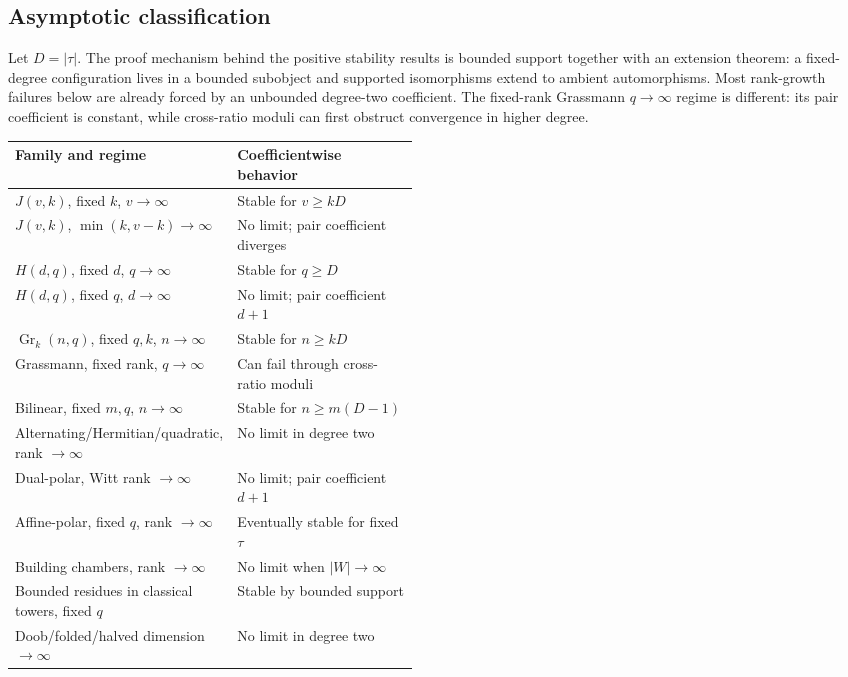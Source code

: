 \documentclass[10pt]{article}
\newcommand{\Gr}{\operatorname{Gr}}
\begin{document}
\subsection{Asymptotic classification}

Let $D=|\tau|$. The proof mechanism behind the positive stability results is
bounded support together with an extension theorem: a fixed-degree
configuration lives in a bounded subobject and supported isomorphisms extend
to ambient automorphisms. Most rank-growth failures below are already forced
by an unbounded degree-two coefficient. The fixed-rank Grassmann
$q\to\infty$ regime is different: its pair coefficient is constant, while
cross-ratio moduli can first obstruct convergence in higher degree.

\begin{center}
\small
\renewcommand{\arraystretch}{1.12}
\begin{tabularx}{\linewidth}{@{}>{\raggedright\arraybackslash}p{0.47\linewidth}X@{}}
\toprule
Family and regime & Coefficientwise behavior \\
\midrule
$J(v,k)$, fixed $k$, $v\to\infty$ & Stable for $v\geq kD$ \\
$J(v,k)$, $\min(k,v-k)\to\infty$ & No limit; pair coefficient diverges \\
$H(d,q)$, fixed $d$, $q\to\infty$ & Stable for $q\geq D$ \\
$H(d,q)$, fixed $q$, $d\to\infty$ & No limit; pair coefficient $d+1$ \\
$\Gr_k(n,q)$, fixed $q,k$, $n\to\infty$ & Stable for $n\geq kD$ \\
Grassmann, fixed rank, $q\to\infty$ & Can fail through cross-ratio moduli \\
Bilinear, fixed $m,q$, $n\to\infty$ & Stable for $n\geq m(D-1)$ \\
Alternating/Hermitian/quadratic, rank $\to\infty$ & No limit in degree two \\
Dual-polar, Witt rank $\to\infty$ & No limit; pair coefficient $d+1$ \\
Affine-polar, fixed $q$, rank $\to\infty$ & Eventually stable for fixed $\tau$ \\
Building chambers, rank $\to\infty$ & No limit when $|W|\to\infty$ \\
Bounded residues in classical towers, fixed $q$ & Stable by bounded support \\
Doob/folded/halved dimension $\to\infty$ & No limit in degree two \\
\bottomrule
\end{tabularx}
\end{center}
\end{document}

